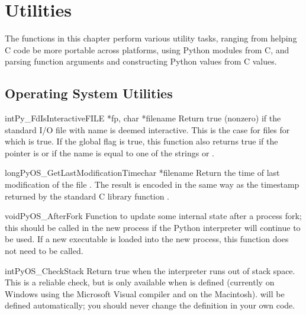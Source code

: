 \chapter{Utilities \label{utilities}}

The functions in this chapter perform various utility tasks, ranging
from helping C code be more portable across platforms, using Python
modules from C, and parsing function arguments and constructing Python
values from C values.


\section{Operating System Utilities \label{os}}

\begin{cfuncdesc}{int}{Py_FdIsInteractive}{FILE *fp, char *filename}
  Return true (nonzero) if the standard I/O file  with name
   is deemed interactive.  This is the case for files
  for which  is true.  If the global
  flag  is true, this function also returns
  true if the  pointer is \NULL{} or if the name is
  equal to one of the strings  or .
\end{cfuncdesc}

\begin{cfuncdesc}{long}{PyOS_GetLastModificationTime}{char *filename}
  Return the time of last modification of the file .
  The result is encoded in the same way as the timestamp returned by
  the standard C library function .
\end{cfuncdesc}

\begin{cfuncdesc}{void}{PyOS_AfterFork}{}
  Function to update some internal state after a process fork; this
  should be called in the new process if the Python interpreter will
  continue to be used.  If a new executable is loaded into the new
  process, this function does not need to be called.
\end{cfuncdesc}

\begin{cfuncdesc}{int}{PyOS_CheckStack}{}
  Return true when the interpreter runs out of stack space.  This is a
  reliable check, but is only available when 
  is defined (currently on Windows using the Microsoft Visual \Cpp{}
  compiler and on the Macintosh).   will be
  defined automatically; you should never change the definition in
  your own code.
\end{cfuncdesc}

